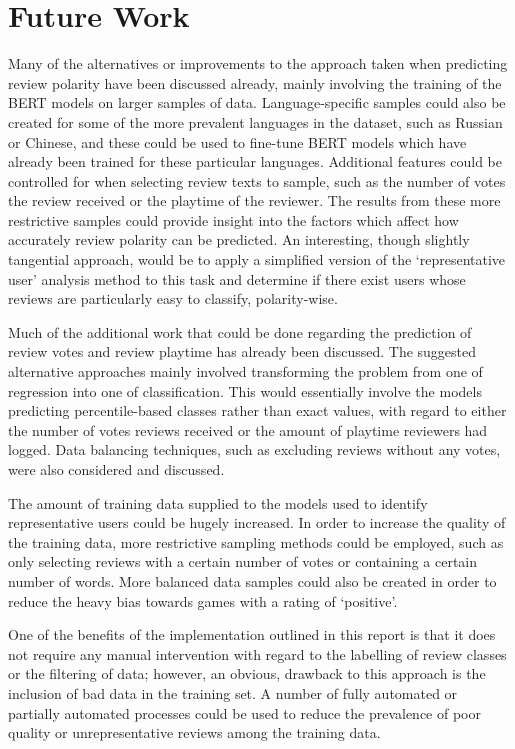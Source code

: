 \section{Future Work} \label{sec:Conc_FW}

Many of the alternatives or improvements to the approach taken when predicting review polarity have been discussed already, mainly involving the training of the BERT models on larger samples of data. Language-specific samples could also be created for some of the more prevalent languages in the dataset, such as Russian or Chinese, and these could be used to fine-tune BERT models which have already been trained for these particular languages. Additional features could be controlled for when selecting review texts to sample, such as the number of votes the review received or the playtime of the reviewer. The results from these more restrictive samples could provide insight into the factors which affect how accurately review polarity can be predicted. An interesting, though slightly tangential approach, would be to apply a simplified version of the `representative user' analysis method to this task and determine if there exist users whose reviews are particularly easy to classify, polarity-wise.

Much of the additional work that could be done regarding the prediction of review votes and review playtime has already been discussed. The suggested alternative approaches mainly involved transforming the problem from one of regression into one of classification. This would essentially involve the models predicting percentile-based classes rather than exact values, with regard to either the number of votes reviews received or the amount of playtime reviewers had logged. Data balancing techniques, such as excluding reviews without any votes, were also considered and discussed.

The amount of training data supplied to the models used to identify representative users could be hugely increased. In order to increase the quality of the training data, more restrictive sampling methods could be employed, such as only selecting reviews with a certain number of votes or containing a certain number of words. More balanced data samples could also be created in order to reduce the heavy bias towards games with a rating of `positive'.

One of the benefits of the implementation outlined in this report is that it does not require any manual intervention with regard to the labelling of review classes or the filtering of data; however, an obvious, drawback to this approach is the inclusion of bad data in the training set. A number of fully automated or partially automated processes could be used to reduce the prevalence of poor quality or unrepresentative reviews among the training data.

